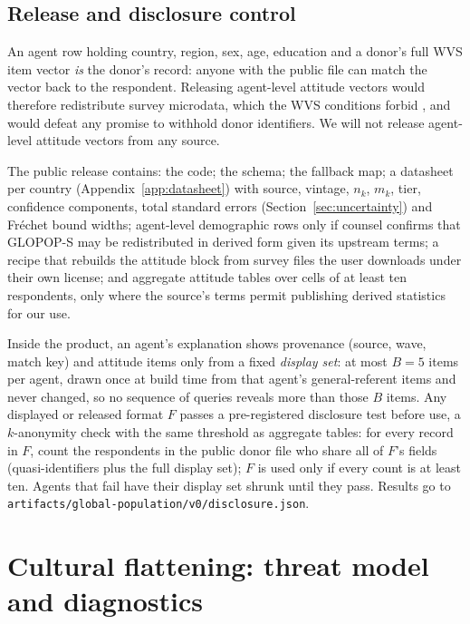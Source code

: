 \documentclass[10pt]{article}
\begin{document}
\subsection{Release and disclosure control}
\label{sec:release}

An agent row holding country, region, sex, age, education and a donor's full WVS item vector \emph{is} the donor's record: anyone with the public file can match the vector back to the respondent. Releasing agent-level attitude vectors would therefore redistribute survey microdata, which the WVS conditions forbid \citep{wvsconditions}, and would defeat any promise to withhold donor identifiers. We will not release agent-level attitude vectors from any source.

The public release contains: the code; the schema; the fallback map; a datasheet per country (Appendix~\ref{app:datasheet}) with source, vintage, $n_k$, $m_k$, tier, confidence components, total standard errors (Section~\ref{sec:uncertainty}) and Fréchet bound widths; agent-level demographic rows only if counsel confirms that GLOPOP-S may be redistributed in derived form given its upstream terms; a recipe that rebuilds the attitude block from survey files the user downloads under their own license; and aggregate attitude tables over cells of at least ten respondents, only where the source's terms permit publishing derived statistics for our use.

Inside the product, an agent's explanation shows provenance (source, wave, match key) and attitude items only from a fixed \emph{display set}: at most $B = 5$ items per agent, drawn once at build time from that agent's general-referent items and never changed, so no sequence of queries reveals more than those $B$ items. Any displayed or released format $F$ passes a pre-registered disclosure test before use, a $k$-anonymity check \citep{sweeney2002} with the same threshold as aggregate tables: for every record in $F$, count the respondents in the public donor file who share all of $F$'s fields (quasi-identifiers plus the full display set); $F$ is used only if every count is at least ten. Agents that fail have their display set shrunk until they pass. Results go to \nolinkurl{artifacts/global-population/v0/disclosure.json}.

\section{Cultural flattening: threat model and diagnostics}
\label{sec:flattening}
\end{document}
